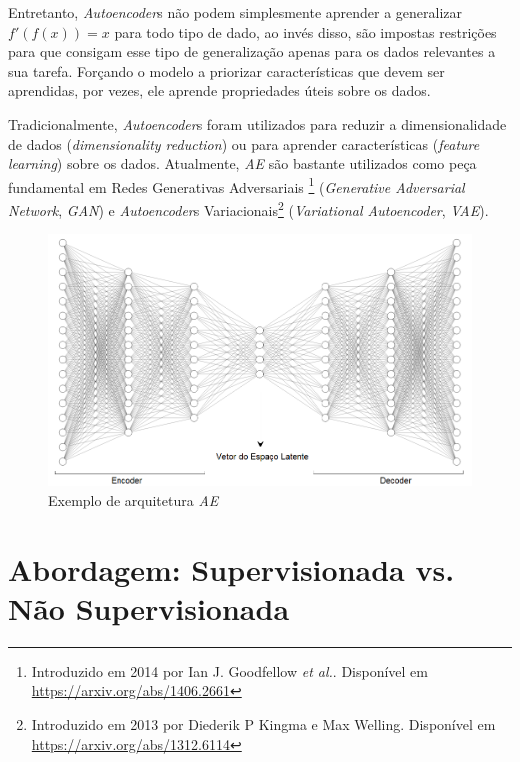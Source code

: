 Entretanto, \textit{Autoencoder}s não podem simplesmente aprender a generalizar $f'(f(x)) = x$ para todo tipo de dado, ao invés disso, são impostas restrições para que consigam esse tipo de generalização apenas para os dados relevantes a sua tarefa. Forçando o modelo a priorizar características que devem ser aprendidas, por vezes, ele aprende propriedades úteis sobre os dados.

Tradicionalmente, \textit{Autoencoder}s foram utilizados para reduzir a dimensionalidade de dados (\textit{dimensionality reduction}) ou para aprender características (\textit{feature learning}) sobre os dados. Atualmente, \textit{AE} são bastante utilizados como peça fundamental em Redes Generativas Adversariais \footnote{Introduzido em 2014 por Ian J. Goodfellow \textit{et al.}. Disponível em \url{https://arxiv.org/abs/1406.2661}} (\textit{Generative Adversarial Network}, \textit{GAN}) e \textit{Autoencoder}s Variacionais\footnote{Introduzido em 2013 por Diederik P Kingma e Max Welling. Disponível em \url{https://arxiv.org/abs/1312.6114}} (\textit{Variational Autoencoder}, \textit{VAE}).

\begin{figure}[!h]
\centering
\includegraphics[width=1.0\textwidth]{imagens/ex-ae.PNG}
\caption{\label{fig:exarqae}Exemplo de arquitetura \textit{AE}}
\end{figure}

\section{Abordagem: Supervisionada vs. Não Supervisionada}

